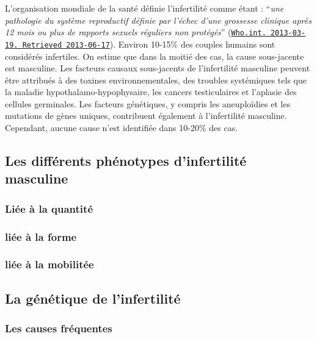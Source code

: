 \documentclass[12pt,twoside]{reedthesis}
\theoremstyle{definition}
\theoremstyle{definition}
\theoremstyle{remark}
\begin{document}
  L'organisation mondiale de la santé définie l'infertilité comme étant :
  ``\emph{une pathologie du système reproductif définie par l'échec d'une
  grossesse clinique après 12 mois ou plus de rapports sexuels réguliers
  non protégés}''
  (\href{http://www.who.int/reproductivehealth/topics/infertility/definitions/en/}{\texttt{Who.int.\ 2013-03-19.\ Retrieved\ 2013-06-17}}).
  Environ 10-15\% des couples humains sont considérés infertiles. On
  estime que dans la moitié des cas, la cause sous-jacente est masculine.
  Les facteurs causaux sous-jacents de l'infertilité masculine peuvent
  être attribués à des toxines environnementales, des troubles systémiques
  tels que la maladie hypothalamo-hypophysaire, les cancers testiculaires
  et l'aplasie des cellules germinales. Les facteurs génétiques, y compris
  les aneuploïdies et les mutations de gènes uniques, contribuent
  également à l'infertilité masculine. Cependant, aucune cause n'est
  identifiée dans 10-20\% des cas.
  
  \subsection{Les différents phénotypes d'infertilité
  masculine}\label{les-differents-phenotypes-dinfertilite-masculine}
  
  \subsubsection{Liée à la quantité}\label{liee-a-la-quantite}
  
  \subsubsection{liée à la forme}\label{liee-a-la-forme}
  
  \subsubsection{liée à la mobilitée}\label{liee-a-la-mobilitee}
  
  \subsection{La génétique de
  l'infertilité}\label{la-genetique-de-linfertilite}
  
  \subsubsection{Les causes fréquentes}\label{les-causes-frequentes}
  
\end{document}
